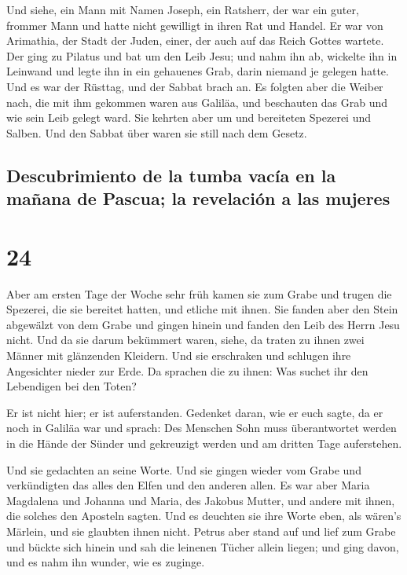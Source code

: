  Und siehe, ein Mann mit Namen Joseph, ein Ratsherr, der
war ein guter, frommer Mann  und hatte nicht gewilligt in
ihren Rat und Handel. Er war von Arimathia, der Stadt der Juden, einer,
der auch auf das Reich Gottes wartete.  Der ging zu
Pilatus und bat um den Leib Jesu;  und nahm ihn ab,
wickelte ihn in Leinwand und legte ihn in ein gehauenes Grab, darin
niemand je gelegen hatte.  Und es war der Rüsttag, und
der Sabbat brach an.  Es folgten aber die Weiber nach,
die mit ihm gekommen waren aus Galiläa, und beschauten das Grab und wie
sein Leib gelegt ward.  Sie kehrten aber um und
bereiteten Spezerei und Salben. Und den Sabbat über waren sie still nach
dem Gesetz.

\hypertarget{descubrimiento-de-la-tumba-vacuxeda-en-la-mauxf1ana-de-pascua-la-revelaciuxf3n-a-las-mujeres}{%
\subsection{Descubrimiento de la tumba vacía en la mañana de Pascua; la
revelación a las
mujeres}\label{descubrimiento-de-la-tumba-vacuxeda-en-la-mauxf1ana-de-pascua-la-revelaciuxf3n-a-las-mujeres}}

\hypertarget{section-23}{%
\section{24}\label{section-23}}

 Aber am ersten Tage der Woche sehr früh kamen sie zum
Grabe und trugen die Spezerei, die sie bereitet hatten, und etliche mit
ihnen.  Sie fanden aber den Stein abgewälzt von dem Grabe
 und gingen hinein und fanden den Leib des Herrn Jesu
nicht.  Und da sie darum bekümmert waren, siehe, da traten
zu ihnen zwei Männer mit glänzenden Kleidern.  Und sie
erschraken und schlugen ihre Angesichter nieder zur Erde. Da sprachen
die zu ihnen: Was suchet ihr den Lebendigen bei den Toten?

 Er ist nicht hier; er ist auferstanden. Gedenket daran,
wie er euch sagte, da er noch in Galiläa war  und sprach:
Des Menschen Sohn muss überantwortet werden in die Hände der Sünder und
gekreuzigt werden und am dritten Tage auferstehen.

 Und sie gedachten an seine Worte.  Und sie
gingen wieder vom Grabe und verkündigten das alles den Elfen und den
anderen allen.  Es war aber Maria Magdalena und Johanna
und Maria, des Jakobus Mutter, und andere mit ihnen, die solches den
Aposteln sagten.  Und es deuchten sie ihre Worte eben,
als wären's Märlein, und sie glaubten ihnen nicht. 
Petrus aber stand auf und lief zum Grabe und bückte sich hinein und sah
die leinenen Tücher allein liegen; und ging davon, und es nahm ihn
wunder, wie es zuginge.

